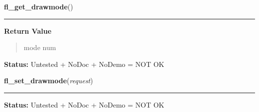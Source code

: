     \label{xformslib:library:fl_get_drawmode}

    \vspace{0.5ex}

\hspace{.8\funcindent}\begin{boxedminipage}{\funcwidth}

    \raggedright \textbf{fl\_get\_drawmode}()

    \vspace{-1.5ex}

    \rule{\textwidth}{0.5\fboxrule}
\setlength{\parskip}{2ex}
\setlength{\parskip}{1ex}
      \textbf{Return Value}
    \vspace{-1ex}

      \begin{quote}
      mode num

      \end{quote}

\textbf{Status:} Untested + NoDoc + NoDemo = NOT OK



    \end{boxedminipage}

    \label{xformslib:library:fl_drawmode}

    \vspace{0.5ex}

\hspace{.8\funcindent}\begin{boxedminipage}{\funcwidth}

    \raggedright \textbf{fl\_set\_drawmode}(\textit{request})

    \vspace{-1.5ex}

    \rule{\textwidth}{0.5\fboxrule}
\setlength{\parskip}{2ex}
\setlength{\parskip}{1ex}
\textbf{Status:} Untested + NoDoc + NoDemo = NOT OK



    \end{boxedminipage}

    \label{xformslib:library:fl_oval}

    \vspace{0.5ex}

